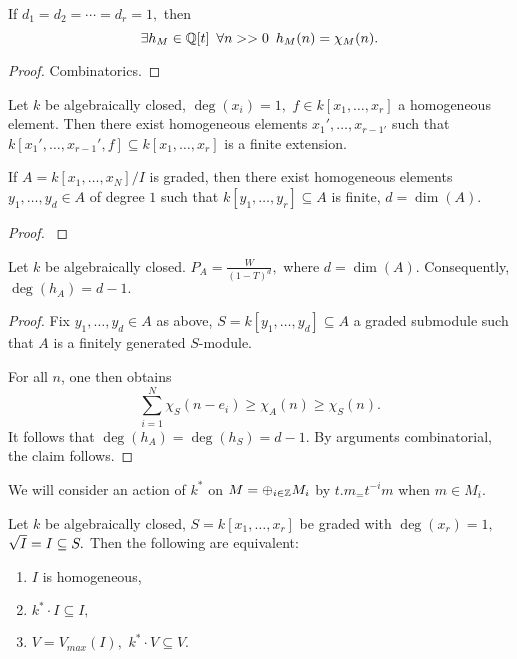 \begin{corollary}
  If \(d_1 = d_2 = \dotsb = d_r = 1,\) then
  \[\exists h_M \in \mathbb Q[t] \enspace \forall n >> 0 \enspace h_M(n) = \chi_M(n).\]
\end{corollary}
\begin{proof}
  Combinatorics.
\end{proof}


\begin{prop}
  Let \(k\) be algebraically closed, \(\deg(x_i) = 1,\) \(f \in k[x_1, \dotsc, x_r]\) a homogeneous element. Then there exist homogeneous elements
  \(x_1', \dotsc, x_{r-1'}\)
  such that
  \(k[x_1', \dotsc, x_{r-1}', f] \subseteq k[x_1, \dotsc, x_r]\) is a finite extension.
\end{prop}

\begin{corollary}
  If \(A = k[x_1, \dotsc, x_N] / {I}\) is graded, then there exist homogeneous elements \(y_1, \dotsc, y_d \in A\) of degree \(1\) such that
  \(k[y_1, \dotsc, y_r] \subseteq A\) is finite, \(d = \dim(A).\)
\end{corollary}
\begin{proof}
\cite{eisenbud1995commutative}
\end{proof}


\begin{theorem}
  Let \(k\) be algebraically closed.
  \(P_A = \frac{W}{(1-T)^d},\) where \(d = \dim(A).\) Consequently, \(\deg(h_A) = d - 1.\)
\end{theorem}
\begin{proof}
  Fix \(y_1, \dotsc, y_d \in A\) as above, \(S = k[y_1, \dotsc, y_d] \subseteq A\) a graded submodule such that \(A\) is a finitely generated \(S\)-module.

  For all \(n\), one then obtains
  \[\sum_{i=1}^N \chi_S(n - e_i) \geq \chi_A(n) \geq \chi_S(n).\]
  It follows that \(\deg(h_A) = \deg(h_S) = d-1.\)
  By arguments combinatorial, the claim follows.
\end{proof}

We will consider an action of \(k^*\) on \(M = \oplus_{i \in \mathbb Z} M_i\) by \(t . m_ = t^{-i} m\) when \(m \in M_i.\)

\begin{prop}
  Let \(k\) be algebraically closed, \(S = k[x_1, \dotsc, x_r]\) be graded with \(\deg(x_r) = 1,\) \(\sqrt{I} = I \subseteq S.\) Then the following are equivalent:
  \begin{enumerate}
  \item \(I\) is homogeneous,
  \item \(k^* \cdot I \subseteq I,\)
  \item \(V = V_{max}(I),\) \(k^* \cdot V \subseteq V.\)
  \end{enumerate}
\end{prop}

